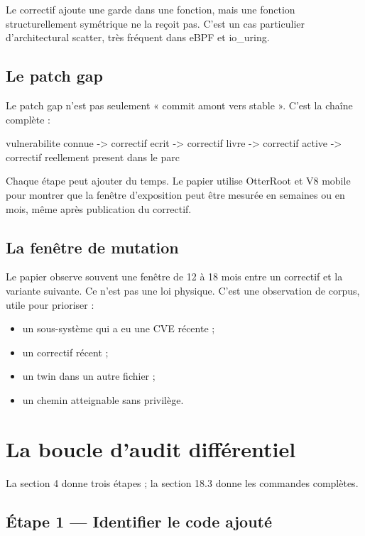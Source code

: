 \documentclass{training}
\begin{document}
Le correctif ajoute une garde dans une fonction, mais une fonction
structurellement symétrique ne la reçoit pas. C'est un cas particulier
d'architectural scatter, très fréquent dans eBPF et io\_uring.

\section*{Le patch gap}

Le patch gap n'est pas seulement « commit amont vers stable ». C'est la
chaîne complète :

\begin{console}
vulnerabilite connue
  -> correctif ecrit
  -> correctif livre
  -> correctif active
  -> correctif reellement present dans le parc
\end{console}

Chaque étape peut ajouter du temps. Le papier utilise OtterRoot et V8 mobile
pour montrer que la fenêtre d'exposition peut être mesurée en semaines ou en
mois, même après publication du correctif.

\section*{La fenêtre de mutation}

Le papier observe souvent une fenêtre de 12 à 18 mois entre un correctif et
la variante suivante. Ce n'est pas une loi physique. C'est une observation de
corpus, utile pour prioriser :

\begin{itemize}
  \item un sous-système qui a eu une CVE récente ;
  \item un correctif récent ;
  \item un twin dans un autre fichier ;
  \item un chemin atteignable sans privilège.
\end{itemize}

\chapter{La boucle d'audit différentiel}

La section 4 donne trois étapes ; la section 18.3 donne les commandes
complètes.

\section*{Étape 1 --- Identifier le code ajouté}
\end{document}
